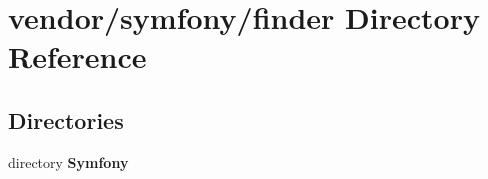 \section{vendor/symfony/finder Directory Reference}
\label{dir_774dd5be24437bc733282eb35d1f73c0}
\subsection*{Directories}
\begin{DoxyCompactItemize}
\item 
directory {\bf Symfony}
\end{DoxyCompactItemize}
